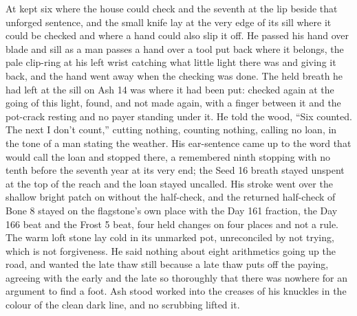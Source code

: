 At   kept six where the house could check and the seventh at the lip beside that unforged sentence, and the small knife lay at the very edge of its sill where it could be checked and where a hand could also slip it off. He passed his hand over blade and sill as a man passes a hand over a tool put back where it belongs, the pale clip-ring at his left wrist catching what little light there was and giving it back, and the hand went away when the checking was done. The held breath he had left at the sill on Ash 14 was where it had been put: checked again at the going of this light, found, and not made again, with a finger between it and the pot-crack resting and no payer standing under it. He told the wood, “Six counted. The next I don't count,” cutting nothing, counting nothing, calling no loan, in the tone of a man stating the weather. His ear-sentence came up to the word that would call the loan and stopped there, a remembered ninth stopping with no tenth before the seventh year at its very end; the Seed 16 breath stayed unspent at the top of the reach and the loan stayed uncalled. His stroke went over the shallow bright patch on  without the half-check, and the returned half-check of Bone 8 stayed on the flagstone's own place with the Day 161 fraction, the Day 166 beat and the Frost 5 beat, four held changes on four places and not a rule. The warm loft stone lay cold in its unmarked pot, unreconciled by not trying, which is not forgiveness. He said nothing about eight arithmetics going up the road, and wanted the late thaw still because a late thaw puts off the paying, agreeing with the early and the late so thoroughly that there was nowhere for an argument to find a foot. Ash stood worked into the creases of his knuckles in the colour of the clean dark line, and no scrubbing lifted it.

